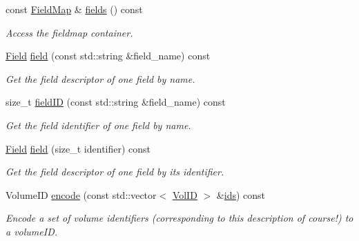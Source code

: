 \begin{DoxyCompactItemize}
const \hyperlink{class_d_d4hep_1_1_geometry_1_1_i_d_descriptor_ac9d6740c50e0c5cf495486c55e5640d4}{Field\+Map} \& \hyperlink{class_d_d4hep_1_1_geometry_1_1_i_d_descriptor_ad233517890d70599ba9f3c7f339cd26a}{fields} () const
\begin{DoxyCompactList}\small\item\em Access the fieldmap container. \end{DoxyCompactList}\item 
\hyperlink{class_d_d4hep_1_1_geometry_1_1_i_d_descriptor_ac06f5915e74f8a8f2ff73e9a322556e4}{Field} \hyperlink{class_d_d4hep_1_1_geometry_1_1_i_d_descriptor_a9179d503a536eab536eef71b20904116}{field} (const std\+::string \&field\+\_\+name) const
\begin{DoxyCompactList}\small\item\em Get the field descriptor of one field by name. \end{DoxyCompactList}\item 
size\+\_\+t \hyperlink{class_d_d4hep_1_1_geometry_1_1_i_d_descriptor_acc299eb8486e58723ef37522775cd696}{field\+ID} (const std\+::string \&field\+\_\+name) const
\begin{DoxyCompactList}\small\item\em Get the field identifier of one field by name. \end{DoxyCompactList}\item 
\hyperlink{class_d_d4hep_1_1_geometry_1_1_i_d_descriptor_ac06f5915e74f8a8f2ff73e9a322556e4}{Field} \hyperlink{class_d_d4hep_1_1_geometry_1_1_i_d_descriptor_a405b5079fa2243dad5a4b6860aba6648}{field} (size\+\_\+t identifier) const
\begin{DoxyCompactList}\small\item\em Get the field descriptor of one field by its identifier. \end{DoxyCompactList}\item 
Volume\+ID \hyperlink{class_d_d4hep_1_1_geometry_1_1_i_d_descriptor_a22f54f9094eae74d4c0b22dddbec1aef}{encode} (const std\+::vector$<$ \hyperlink{class_d_d4hep_1_1_geometry_1_1_i_d_descriptor_a6928b7adb965c1c276f22f62a0633750}{Vol\+ID} $>$ \&\hyperlink{class_d_d4hep_1_1_geometry_1_1_i_d_descriptor_a077a567e44dc8200d05e6eae30c42870}{ids}) const
\begin{DoxyCompactList}\small\item\em Encode a set of volume identifiers (corresponding to this description of course!) to a volume\+ID. \end{DoxyCompactList}\item 

\end{DoxyCompactItemize}
